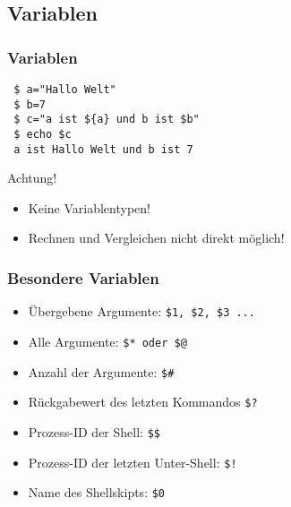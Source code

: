 \documentclass{beamer}
\begin{document}
\subsection{Variablen}
\begin{frame}[fragile]
 \frametitle{Variablen}
 
 \begin{verbatim}
 $ a="Hallo Welt"
 $ b=7
 $ c="a ist ${a} und b ist $b"
 $ echo $c
 a ist Hallo Welt und b ist 7
 \end{verbatim}
 
 \begin{alertblock}{Achtung!}
  \begin{itemize}
   \item Keine Variablentypen!
   \item Rechnen und Vergleichen nicht direkt möglich!
  \end{itemize}
 \end{alertblock}
\end{frame}

\begin{frame}[<+->]
 \frametitle{Besondere Variablen}
 
 \begin{itemize}
  \item Übergebene Argumente: \tt\$1, \$2, \$3 ...
  \item Alle Argumente: \tt\$* oder \$@
  \item Anzahl der Argumente: \tt\$\#
  \item Rückgabewert des letzten Kommandos \tt\$?
  \item Prozess-ID der Shell: \tt\$\$
  \item Prozess-ID der letzten Unter-Shell: \tt\$!
  \item Name des Shellskipts: \tt\$0
 \end{itemize}
\end{frame}
\end{document}

